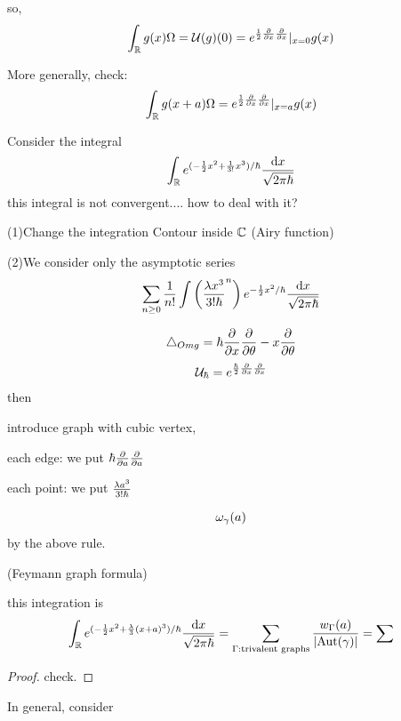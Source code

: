 so,
$$\int_{\mathbb{R}}g(x)\Omega=\mathcal{U}(g)(0)=
e^{\frac{1}{2}\frac{\partial } {\partial x}\frac{\partial } {\partial x}}|_{x=0}g(x)$$

More generally, check:
$$\int_{\mathbb{R}}g(x+a)\Omega=
e^{\frac{1}{2}\frac{\partial } {\partial x}\frac{\partial } {\partial x}}|_{x=a}g(x)$$


\begin{example}
Consider the integral
$$
  \int_{\mathbb{R}}
    e^{(-\frac{1}{2}x^2+\frac{1}{3!}x^3)/\hbar}
    \frac{\mathrm{d} x}{\sqrt{2\pi\hbar}}
$$
this integral is not convergent.... how to deal with it?

(1)Change the integration Contour inside $\mathbb{C}$
(Airy function)

(2)We consider only the asymptotic series
$$
  \sum_{n\geq 0}\frac{1}{n!}
    \int
      \left(
        \frac{\lambda x^3}{3!\hbar}^n
      \right)
      e^{-\frac{1}{2}x^2/\hbar}
      \frac{\mathrm{d} x}{\sqrt{2\pi\hbar}}
$$

$$\triangle_{Omg}=\hbar\frac{\partial } {\partial x}\frac{\partial } {\partial \theta}-x\frac{\partial } {\partial \theta}$$
$$\mathcal{U}_{\hbar}=e^{\frac{\hbar}{2}\frac{\partial } {\partial x}\frac{\partial } {\partial x}}$$
then

introduce graph with cubic vertex,

each edge: we put $\hbar\frac{\partial } {\partial a}\frac{\partial } {\partial a}$

each point: we put $\frac{\lambda a^3}{3!\hbar}$

$$\omega_{\gamma}(a)$$
by the above rule.

\end{example}

\begin{thm}(Feymann graph formula)

this integration is
$$
   \int_{\mathbb{R}}
     e^{(-\frac{1}{2}x^2+\frac{\lambda}{3}(x+a)^3)/\hbar}
     \frac{\mathrm{d} x}{\sqrt{2\pi\hbar}}
=
   \sum_{\Gamma:\text{trivalent graphs}}
     \frac{w_{\Gamma}(a)}
          {|\text{Aut}(\gamma)|}
=
   \sum
$$
\end{thm}
\begin{proof}
check.
\end{proof}

In general, consider









